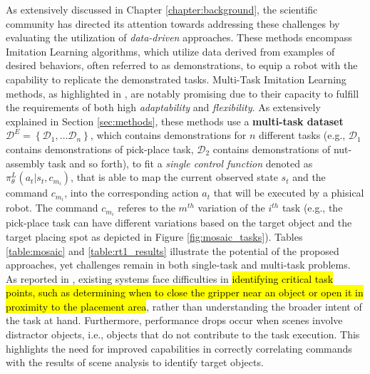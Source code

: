 As extensively discussed in Chapter \ref{chapter:background}, the scientific community has directed its attention towards addressing these challenges by evaluating the utilization of \textit{data-driven} approaches. These methods encompass Imitation Learning algorithms, which utilize data derived from examples of desired behaviors, often referred to as demonstrations, to equip a robot with the capability to replicate the demonstrated tasks.
\newline Multi-Task Imitation Learning methods, as highlighted in \cite{jang2022bc_z, dasari2021transformers_one_shot, mandi2022towards_more_generalizable_one_shot, brohan2022rt}, are notably promising due to their capacity to fulfill the requirements of both high \textit{adaptability} and \textit{flexibility}. As extensively explained in Section \ref{sec:methods}, these methods use a \textbf{multi-task dataset} $\mathcal{D}^{E} = \left \{ \mathcal{D}_{1}, \dots \mathcal{D}_{n}\right \}$, which contains demonstrations for $n$ different tasks (e.g., $\mathcal{D}_{1}$ contains demonstrations of pick-place task, $\mathcal{D}_{2}$ contains demonstrations of nut-assembly task and so forth), to fit a \textit{single control function} denoted as $\pi^{L}_{\theta}(a_{t}|s_{t}, c_{m_{i}})$, that is able to map the current observed state $s_{t}$ and the command $c_{m_{i}}$, into the corresponding action $a_{t}$ that will be executed by a phisical robot. The command $c_{m_{i}}$ referes to the $m^{th}$ variation of the $i^{th}$ task (e.g., the pick-place task can have different variations based on the target object and the target placing spot as depicted in Figure \ref{fig:mosaic_tasks}). Tables \ref{table:mosaic} and \ref{table:rt1_results} illustrate the potential of the proposed approaches, yet challenges remain in both single-task and multi-task problems. As reported in \cite{jang2022bc_z, yu2018daml}, existing systems face difficulties in \hl{identifying critical task}  \hl{points, such as determining when to close the gripper near an object or open it in proximity to the placement area}, rather than understanding the broader intent of the task at hand. Furthermore, performance drops occur when scenes involve distractor objects, i.e.,  objects  that  do  not  contribute  to  the  task  execution. This highlights the need for improved capabilities in correctly correlating commands with the results of scene analysis to identify target objects.

